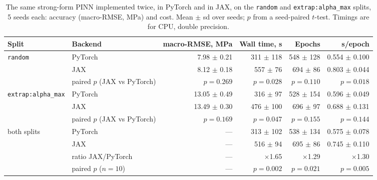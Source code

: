 \documentclass[subscriptcorrection,upint,varvw,barcolor=Goldenrod3,mathalfa=cal=euler,balance,hyphenate,french,pdf-a]{asmejour} %
\begin{document}
\begin{table}[htbp]
\centering
\caption{The same strong-form PINN implemented twice, in PyTorch and in JAX, on the \texttt{random} and \texttt{extrap:alpha\_max} splits, 5 seeds each: accuracy (macro-RMSE, MPa) and cost. Mean $\pm$ sd over seeds; $p$ from a seed-paired $t$-test. Timings are for CPU, double precision.}
\label{tab:backend}
\small
\begin{tabular}{@{}llrrrr@{}}
\toprule
Split & Backend & macro-RMSE, MPa & Wall time, s & Epochs & s/epoch \\
\midrule
\texttt{random} & PyTorch & 7.98 $\pm$ 0.21 & 311 $\pm$ 118 & 548 $\pm$ 128 & 0.554 $\pm$ 0.100 \\
 & JAX & 8.12 $\pm$ 0.18 & 557 $\pm$ 76 & 694 $\pm$ 86 & 0.803 $\pm$ 0.044 \\
 & paired $p$ (JAX vs PyTorch) & $p = 0.269$ & $p = 0.028$ & $p = 0.110$ & $p = 0.018$ \\
\addlinespace
\texttt{extrap:alpha\_max} & PyTorch & 13.05 $\pm$ 0.49 & 316 $\pm$ 97 & 528 $\pm$ 154 & 0.596 $\pm$ 0.049 \\
 & JAX & 13.49 $\pm$ 0.30 & 476 $\pm$ 100 & 696 $\pm$ 97 & 0.688 $\pm$ 0.131 \\
 & paired $p$ (JAX vs PyTorch) & $p = 0.169$ & $p = 0.047$ & $p = 0.155$ & $p = 0.144$ \\
\midrule
both splits & PyTorch & --- & 313 $\pm$ 102 & 538 $\pm$ 134 & 0.575 $\pm$ 0.078 \\
 & JAX & --- & 516 $\pm$ 94 & 695 $\pm$ 86 & 0.745 $\pm$ 0.110 \\
 & ratio JAX/PyTorch & --- & $\times$1.65 & $\times$1.29 & $\times$1.30 \\
 & paired $p$ ($n = 10$) & --- & $p = 0.002$ & $p = 0.021$ & $p = 0.005$ \\
\bottomrule
\end{tabular}
\end{table}
\end{document}
